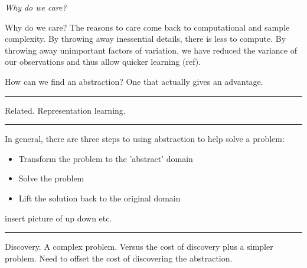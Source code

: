 \begin{displayquote}
 \textit{Why do we care?}
\end{displayquote}

Why do we care? The reasons to care come back to computational and sample complexity.
By throwing away inessential details, there is less to compute.
By throwing away unimportant factors of variation, we have reduced the variance of our observations and thus allow quicker learning (ref).

How can we find an abstraction? One that actually gives an advantage.

\begin{center}\rule{0.5\linewidth}{\linethickness}\end{center}

Related. Representation learning.



\begin{center}\rule{0.5\linewidth}{\linethickness}\end{center}

%

In general, there are three steps to using abstraction to help solve a problem:

\begin{itemize}
\tightlist
  \item Transform the problem to the 'abstract' domain
  \item Solve the problem
  \item Lift the solution back to the original domain
\end{itemize}
insert picture of up down etc.

\begin{center}\rule{0.5\linewidth}{\linethickness}\end{center}

Discovery.
A complex problem. Versus the cost of discovery plus a simpler problem.
Need to offset the cost of discovering the abstraction.





